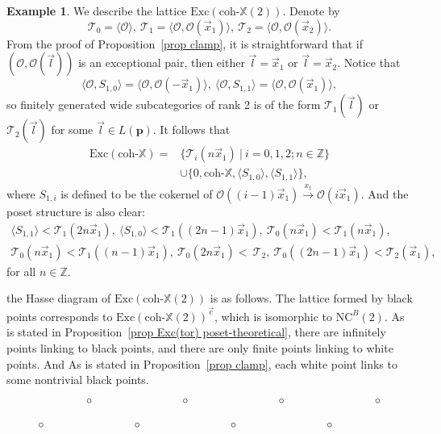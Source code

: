 \documentclass[a4paper, 11pt, reqno]{amsart}
\numberwithin{equation}{section}
\theoremstyle{remark}
\theoremstyle{definition}
\newtheorem{exa}[thm]{Example}
\begin{document}
\begin{exa}
   We describe the lattice $\mathrm{Exc}(\mathrm{coh} \text{-} \mathbb X(2))$. Denote by
   \[\mathcal T_0=\langle \mathcal O \rangle, \ \mathcal T_1=\langle \mathcal O, \mathcal O(\vec x_1) \rangle, \ \mathcal T_2=\langle \mathcal O, \mathcal O(\vec x_2)\rangle.\] 
   From the proof of Proposition~\ref{prop clamp}, it is straightforward that if $(\mathcal O, \mathcal O(\vec l))$ is an exceptional pair, then either $\vec l=\vec x_1$ or $\vec l=\vec x_2$. Notice that 
   \[
      \langle \mathcal O,S_{1,0} \rangle=\langle \mathcal O, \mathcal O(-\vec x_1) \rangle, \ \langle \mathcal O,S_{1,1} \rangle=\langle \mathcal O, \mathcal O(\vec x_1) \rangle,
   \]
   so finitely generated wide subcategories of rank 2 is of the form $\mathcal T_1(\vec l)$ or $\mathcal T_2 (\vec l)$ for some $\vec l \in L(\bm p)$. It follows that 
   \begin{align*}
      \mathrm{Exc}(\mathrm{coh} \text{-} \mathbb X)= & \{\mathcal T_i (n \vec x_1) \ | \ i=0,1,2; n \in \mathbb Z \} \\
      & \cup \{0, \mathrm{coh} \text{-} \mathbb X, \langle S_{1,0} \rangle, \langle S_{1,1} \rangle \},
   \end{align*}
   where $S_{1,i}$ is defined to be the cokernel of $\mathcal O((i-1)\vec x_1) \xrightarrow{x_1} \mathcal O(i \vec x_1)$. And the poset structure is also clear: 
   \begin{gather*}
      \langle S_{1,1} \rangle <\mathcal T_1(2n \vec x_1), \ \langle S_{1,0} \rangle <\mathcal T_1((2n-1) \vec x_1), \ \mathcal T_0(n \vec x_1)< \mathcal T_1(n \vec x_1), \\
      \mathcal T_0(n \vec x_1)< \mathcal T_1((n-1) \vec x_1), \ \mathcal T_0(2n \vec x_1)<\ \mathcal T_2 , \ \mathcal T_0((2n-1) \vec x_1)<\mathcal T_2 (\vec x_1),
   \end{gather*}
   for all $n \in \mathbb Z$. 
   
   the Hasse diagram of $\mathrm{Exc}(\mathrm{coh} \text{-} \mathbb X(2))$ is as follows. The lattice formed by black points corresponds to $\mathrm{Exc}(\mathrm{coh} \text{-} \mathbb X(2))^{\vec c}$, which is isomorphic to $\mathrm{NC}^B(2)$. As is stated in Proposition~\ref{prop Exc(tor) poset-theoretical}, there are infinitely points linking to black points, and there are only finite points linking to white points. And As is stated in Proposition~\ref{prop clamp}, each white point links to some nontrivial black points.
   \[
   \tikz[scale=0.75]{
      \node (a1) at (0,0) {$\circ$};
      \node (a2) at (2,1) {$\circ$};
      \node (a3) at (4,0) {$\circ$};
      \node (a4) at (6,1) {$\circ$};
      \node (a5) at (8,0) {$\circ$};
      \node (a6) at (10,1) {$\circ$};
      \node (a7) at (12,0) {$\circ$};
      \node (a8) at (14,1) {$\circ$};

}\]
\end{exa}
\end{document}
